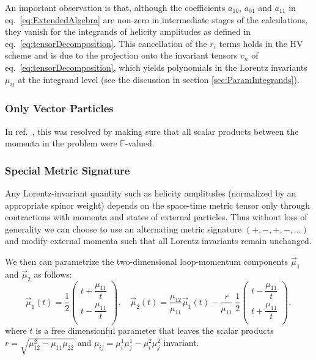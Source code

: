 An important observation is that, although the coefficients 
$a_{10}$, $a_{01}$ and $a_{11}$ in 
eq.~\eqref{eq:ExtendedAlgebra} are non-zero in
intermediate stages of the calculations, they vanish
for the integrands of helicity amplitudes as defined in 
eq.~\eqref{eq:tensorDecomposition}. This cancellation of the
$r_i$ terms holds in the HV scheme and
is due to the projection onto the invariant tensors 
$v_n$ of eq.~\eqref{eq:tensorDecomposition}, 
which yields polynomials in the Lorentz invariants 
$\mu_{ij}$ at the integrand level
(see the discussion in section \ref{sec:ParamIntegrands}).


\subsubsection{Only Vector Particles}
%
In ref.~\cite{Abreu:2017hqn}, this was resolved
by making sure that all scalar products
between the momenta in the problem were $\mathbb{F}$-valued.


\subsubsection{Special Metric Signature}

Any Lorentz-invariant quantity such as helicity amplitudes (normalized by an appropriate spinor weight)
depends on the space-time metric tensor only through contractions with momenta and states of external particles.
Thus  without loss of generality we can choose to use an alternating metric signature $(+,-,+,-,\ldots)$
and modify external momenta such that all Lorentz invariants remain unchanged.

We then can parametrize the two-dimensional loop-momentum components
$\vec{\mu}_1$ and $\vec{\mu}_2$ as follows:
\begin{equation}
  \vec{\mu}_1(t)  = \frac{1}{2}\begin{pmatrix}
    t+\dfrac{\mu_{11}}{t} \\
    t-\dfrac{\mu_{11}}{t} \\
  \end{pmatrix}, \quad
  \vec{\mu}_2(t)  = \frac{\mu_{12}}{\mu_{11}}\vec{\mu}_1(t) - \frac{r}{\mu_{11}}~\frac{1}{2}\begin{pmatrix}
    t-\dfrac{\mu_{11}}{t} \\
    t+\dfrac{\mu_{11}}{t} \\
  \end{pmatrix},
  \label{eq:muparam}
\end{equation}
where $t$ is a free dimensionful parameter that leaves the scalar products
$r = \sqrt{\mu_{12}^2-\mu_{11} \mu_{22}}$ and 
$\mu_{ij} = \mu_i^1 \mu_j^1 - \mu_i^2 \mu_j^2$ invariant. %

